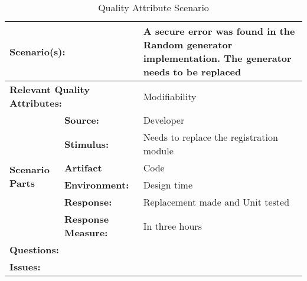 \begin{table}[H]
\begin{center}
\begin{tabular}{|p{0.3cm}|p{2.5cm}|p{8cm}|}
  \hline
  \multicolumn{2}{|p{3cm}|}{\bfseries Scenario(s):} & A secure error was found in the Random generator implementation. The generator needs to be replaced \\
  \hline
  \multicolumn{2}{|p{3cm}|}{\bfseries Relevant Quality Attributes:} & Modifiability\\
  \hline
  \multirow{6}{*}{\begin{sideways}{\bfseries Scenario Parts}\end{sideways}}
  & {\bfseries Source:} & Developer \\
  \cline{2-3}
  & {\bfseries Stimulus:} & Needs to replace the registration module \\
  \cline{2-3}
  & {\bfseries Artifact} &  Code \\
  \cline{2-3}
  & {\bfseries Environment:} &  Design time \\
  \cline{2-3}
  & {\bfseries Response:} &  Replacement made and Unit tested\\
  \cline{2-3}
  & {\bfseries Response Measure:} & In three hours\\
  \hline
  \multicolumn{2}{|p{3cm}|}{\bfseries Questions:} &  \\
  \hline
  \multicolumn{2}{|p{3cm}|}{\bfseries Issues:} &  \\
  \hline
\end{tabular}
\caption{Quality Attribute Scenario}
\end{center}
\end{table}



